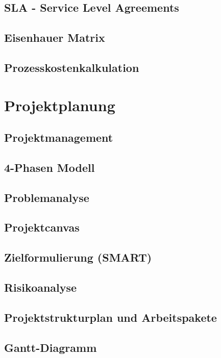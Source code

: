 \subsection{SLA - Service Level Agreements}

\subsection{Eisenhauer Matrix}

\subsection{Prozesskostenkalkulation}

\section{Projektplanung}

\subsection{Projektmanagement}

\subsection{4-Phasen Modell}

\subsection{Problemanalyse}

\subsection{Projektcanvas}

\subsection{Zielformulierung (SMART)}

\subsection{Risikoanalyse}

\subsection{Projektstrukturplan und Arbeitspakete}

\subsection{Gantt-Diagramm}

